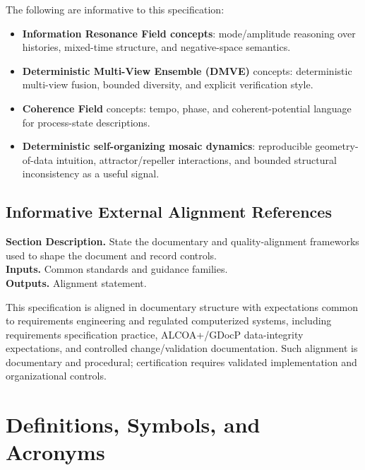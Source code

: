 \documentclass[11pt]{report}
\newcommand{\meta}[3]{\textbf{Section Description.} #1\\
\textbf{Inputs.} #2\\
\textbf{Outputs.} #3\par}
\begin{document}
The following are informative to this specification:
\begin{itemize}
    \item \textbf{Information Resonance Field concepts}: mode/amplitude reasoning over histories, mixed-time structure, and negative-space semantics.
    \item \textbf{Deterministic Multi-View Ensemble (DMVE)} concepts: deterministic multi-view fusion, bounded diversity, and explicit verification style.
    \item \textbf{Coherence Field} concepts: tempo, phase, and coherent-potential language for process-state descriptions.
    \item \textbf{Deterministic self-organizing mosaic dynamics}: reproducible geometry-of-data intuition, attractor/repeller interactions, and bounded structural inconsistency as a useful signal.
\end{itemize}

\section{Informative External Alignment References}
\meta{State the documentary and quality-alignment frameworks used to shape the document and record controls.}{Common standards and guidance families.}{Alignment statement.}

This specification is aligned in documentary structure with expectations common to requirements engineering and regulated computerized systems, including requirements specification practice, ALCOA+/GDocP data-integrity expectations, and controlled change/validation documentation. Such alignment is documentary and procedural; certification requires validated implementation and organizational controls.

\chapter{Definitions, Symbols, and Acronyms}
\end{document}
